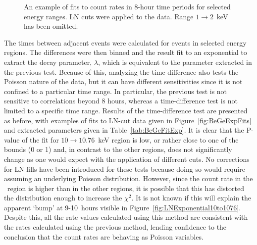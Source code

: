 			\begin{sidewaysfigure}
				\centering
				\def\figwidth{0.45\textheight}
				\def\plotname{LN_Poisson_Region}
				\subfigure[$0.45\to0.55$~keV]{
					\texttt{[image: \\plotname\_0.45\_0.55]}
					\label{fig:\plotname45to55}
				}			
				\subfigure[$0.5\to1$~keV]{
					\texttt{[image: \\plotname\_0.5\_1]}
					\label{fig:\plotname5to1}
				}
				\subfigure[$3\to8$~keV]{
					\texttt{[image: \\plotname\_3\_8]}
					\label{fig:\plotname3to8}
				}
				\subfigure[$10\to10.76$~keV]{
					\texttt{[image: \\plotname\_10\_10.76]}
					\label{fig:\plotname10to1076}
				}								
				\caption[Fits to count rates in 8-hour time periods for selected energy ranges]
				{An example of fits to count rates in 8-hour time periods for selected energy ranges.  
				LN cuts were applied to the data.  Range $1\to2$~keV has been omitted.}
				\label{fig:BeGeRateFits}
			\end{sidewaysfigure}

	The times between adjacent events were calculated for events in selected energy regions.  The differences were then binned and the result fit to an exponential to extract the decay parameter, $\lambda$, which is equivalent to the parameter extracted in the previous test.  Because of this, analyzing the time-difference also tests the Poisson nature of the data, but it can have different sensitivities since it is not confined to a particular time range.  In particular, the previous test is not sensitive to correlations beyond 8 hours, whereas a time-difference test is not limited to a specific time range.  Results of the time-difference test are presented as before, with examples of fits to LN-cut data given in Figure~\ref{fig:BeGeExpFits} and extracted parameters given in Table~\ref{tab:BeGeFitExp}.  It is clear that the P-value of the fit for $10 \to 10.76$~keV region is low, or rather close to one of the bounds (0 or 1) and, in contrast to the other regions, does not significantly change as one would expect with the application of different cuts.  No corrections for LN fills have been introduced for these tests because doing so would require assuming an underlying Poisson distribution.  However, since the count rate in the \gersixeight ~region is higher than in the other regions, it is possible that this has distorted the distribution enough to increase the $\chi^{2}$.  It is not known if this will explain the apparent `bump' at 9-10~hours visible in Figure~\ref{fig:LNExponential10to1076}.  Despite this, all the rate values calculated using this method are consistent with the rates calculated using the previous method, lending confidence to the conclusion that the count rates are behaving as Poisson variables.


